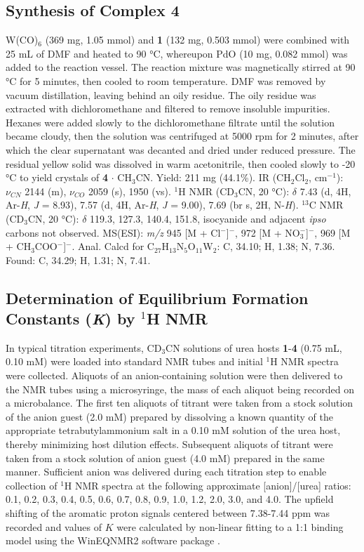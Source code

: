\subsection{Synthesis of Complex \textbf{4}}
W(CO)$_{6}$ (369 mg, 1.05 mmol) and \textbf{1} (132 mg, 0.503 mmol) were combined with 25 mL of DMF and heated to 90 °C, whereupon PdO (10 mg, 0.082 mmol) was added to the reaction vessel. The reaction mixture was magnetically stirred at 90 °C for 5 minutes, then cooled to room temperature. DMF was removed by vacuum distillation, leaving behind an oily residue. The oily residue was extracted with dichloromethane and filtered to remove insoluble impurities. Hexanes were added slowly to the dichloromethane filtrate until the solution became cloudy, then the solution was centrifuged at 5000 rpm for 2 minutes, after which the clear supernatant was decanted and dried under reduced pressure. The residual yellow solid was dissolved in warm acetonitrile, then cooled slowly to -20 °C to yield crystals of \textbf{4} $\cdot$ CH$_{3}$CN. Yield: 211 mg (44.1\%). IR (CH$_{2}$Cl$_{2}$, cm$^{-1}$): $\nu_{CN}$ 2144 (m), $\nu_{CO}$ 2059 (s), 1950 (vs). $^{1}$H NMR (CD$_{3}$CN, 20 °C): $\delta$ 7.43 (d, 4H, Ar-\textit{H}, \textit{J} = 8.93), 7.57 (d, 4H, Ar-\textit{H}, \textit{J} = 9.00), 7.69 (br s, 2H, N-\textit{H}). $^{13}$C NMR (CD$_{3}$CN, 20 °C): $\delta$ 119.3, 127.3, 140.4, 151.8, isocyanide and adjacent \textit{ipso} carbons not observed. MS(ESI): \textit{m/z} 945 [M + Cl$^{-}$]$^{-}$, 972 [M + NO$_{3}^{-}$]$^{-}$, 969 [M + CH$_{3}$COO$^{-}$]$^{-}$. Anal. Calcd for C$_{27}$H$_{13}$N$_{5}$O$_{11}$W$_{2}$: C, 34.10; H, 1.38; N, 7.36. Found: C, 34.29; H, 1.31; N, 7.41.

\subsection{Determination of Equilibrium Formation Constants (\textit{K}) by \texorpdfstring{$^{1}$H}{1H} NMR}
In typical titration experiments, CD$_{3}$CN solutions of urea hosts \textbf{1}-\textbf{4} (0.75 mL, 0.10 mM) were loaded into standard NMR tubes and initial $^{1}$H NMR spectra were collected. Aliquots of an anion-containing solution were then delivered to the NMR tubes using a microsyringe, the mass of each aliquot being recorded on a microbalance. The first ten aliquots of titrant were taken from a stock solution of the anion guest (2.0 mM) prepared by dissolving a known quantity of the appropriate tetrabutylammonium salt in a 0.10 mM solution of the urea host, thereby minimizing host dilution effects. Subsequent aliquots of titrant were taken from a stock solution of anion guest (4.0 mM) prepared in the same manner. Sufficient anion was delivered during each titration step to enable collection of $^{1}$H NMR spectra at the following approximate [anion]/[urea] ratios: 0.1, 0.2, 0.3, 0.4, 0.5, 0.6, 0.7, 0.8, 0.9, 1.0, 1.2, 2.0, 3.0, and 4.0. The upfield shifting of the aromatic proton signals centered between 7.38-7.44 ppm was recorded and values of $K$ were calculated by non-linear fitting to a 1:1 binding model using the WinEQNMR2 software package \citep{Hynes1993}. 

